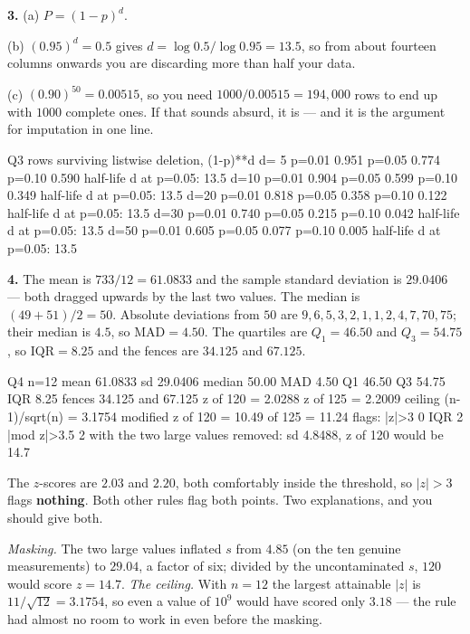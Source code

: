 \documentclass[11pt]{article}
\begin{document}
\medskip
\textbf{3.} (a) $P = (1-p)^d$.

(b) $(0.95)^d = 0.5$ gives $d = \log 0.5 / \log 0.95 = 13.5$, so from about
fourteen columns onwards you are discarding more than half your data.

(c) $(0.90)^{50} = 0.00515$, so you need $1000/0.00515 = 194{,}000$ rows to end
up with $1000$ complete ones. If that sounds absurd, it is --- and it is the
argument for imputation in one line.

\begin{codeout}
Q3  rows surviving listwise deletion, (1-p)**d
    d= 5   p=0.01 0.951   p=0.05 0.774   p=0.10 0.590   half-life d at p=0.05: 13.5
    d=10   p=0.01 0.904   p=0.05 0.599   p=0.10 0.349   half-life d at p=0.05: 13.5
    d=20   p=0.01 0.818   p=0.05 0.358   p=0.10 0.122   half-life d at p=0.05: 13.5
    d=30   p=0.01 0.740   p=0.05 0.215   p=0.10 0.042   half-life d at p=0.05: 13.5
    d=50   p=0.01 0.605   p=0.05 0.077   p=0.10 0.005   half-life d at p=0.05: 13.5
\end{codeout}

\medskip
\textbf{4.} The mean is $733/12 = 61.0833$ and the sample standard deviation is
$29.0406$ --- both dragged upwards by the last two values. The median is
$(49+51)/2 = 50$. Absolute deviations from $50$ are
$9, 6, 5, 3, 2, 1, 1, 2, 4, 7, 70, 75$; their median is $4.5$, so
$\mathrm{MAD} = 4.50$. The quartiles are $Q_1 = 46.50$ and $Q_3 = 54.75$, so
$\mathrm{IQR} = 8.25$ and the fences are $34.125$ and $67.125$.

\begin{codeout}
Q4  n=12  mean 61.0833  sd 29.0406  median 50.00  MAD 4.50
    Q1 46.50  Q3 54.75  IQR 8.25  fences 34.125 and 67.125
    z of 120 = 2.0288   z of 125 = 2.2009   ceiling (n-1)/sqrt(n) = 3.1754
    modified z of 120 = 10.49   of 125 = 11.24
    flags:  |z|>3 0      IQR 2      |mod z|>3.5 2
    with the two large values removed: sd 4.8488, z of 120 would be 14.7
\end{codeout}

The $z$-scores are $2.03$ and $2.20$, both comfortably inside the threshold, so
$|z| > 3$ flags \textbf{nothing}. Both other rules flag both points. Two
explanations, and you should give both.

\emph{Masking.} The two large values inflated $s$ from $4.85$ (on the ten
genuine measurements) to $29.04$, a factor of six; divided by the
uncontaminated $s$, $120$ would score $z = 14.7$. \emph{The ceiling.} With
$n = 12$ the largest attainable $|z|$ is $11/\sqrt{12} = 3.1754$, so even a
value of $10^{9}$ would have scored only $3.18$ --- the rule had almost no room
to work in even before the masking.
\end{document}
